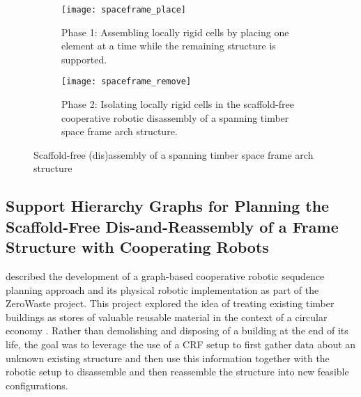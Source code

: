     \begin{figure}[H]
        \centering
        \begin{subfigure}{.99\textwidth}
            \centering
            \texttt{[image: spaceframe\_place]}
            \caption{Phase 1: Assembling locally rigid cells by placing one element at a time while the remaining structure is supported.}
            \label{fig:spaceframe_assembly}
        \end{subfigure}
        
        \vspace{2mm}
        
        \begin{subfigure}{.99\textwidth}
            \centering
            \texttt{[image: spaceframe\_remove]}
            \caption{Phase 2: Isolating locally rigid cells in the scaffold-free cooperative robotic disassembly of a spanning timber space frame arch structure.}
            \label{fig:spaceframe_disassembly}
        \end{subfigure}
        \caption{Scaffold-free (dis)assembly of a spanning timber space frame arch structure}
        \label{fig:spaceframe}
    \end{figure}   

\subsection{Support Hierarchy Graphs for Planning the Scaffold-Free Dis-and-Reassembly of a Frame Structure with Cooperating Robots} \label{sec:04_examples_ZW}
     described the development of a graph-based cooperative robotic sequdence planning approach and its physical robotic implementation as part of the ZeroWaste project. This project explored the idea of treating existing timber buildings as stores of valuable reusable material in the context of a circular economy \citep{bruun_zerowaste_2022,bruun_zerowaste_2024}. Rather than demolishing and disposing of a building at the end of its life, the goal was to leverage the use of a CRF setup to first gather data about an unknown existing structure and then use this information together with the robotic setup to disassemble and then reassemble the structure into new feasible configurations.
    
